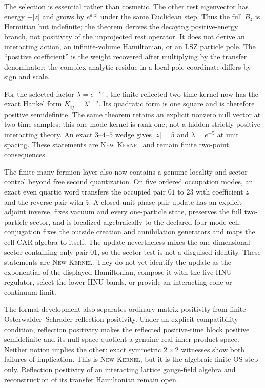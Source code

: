 \documentclass[11pt]{article}
\newcommand{\Kernel}{\textcolor{kernelcolor}{\textsc{Kernel}}}
\newcommand{\NewResult}{\textsc{New}}
\begin{document}
The selection is essential rather than cosmetic.  The other rest eigenvector
has energy $-|z|$ and grows by $e^{a|z|}$ under the same Euclidean step.  Thus
the full $B_z$ is Hermitian but indefinite; the theorem derives the decaying
positive-energy branch, not positivity of the unprojected rest operator.  It
does not derive an interacting action, an infinite-volume Hamiltonian, or an
LSZ particle pole.  The ``positive coefficient'' is the weight recovered after
multiplying by the transfer denominator; the complex-analytic residue in a
local pole coordinate differs by sign and scale.

For the selected factor $\lambda=e^{-a|z|}$, the finite reflected two-time
kernel now has the exact Hankel form $K_{ij}=\lambda^{i+j}$.  Its quadratic
form is one square and is therefore positive semidefinite.  The same theorem
retains an explicit nonzero null vector at two time samples: this one-mode
kernel is rank one, not a hidden strictly positive interacting theory.  An
exact $3$--$4$--$5$ wedge gives $|z|=5$ and $\lambda=e^{-5}$ at unit spacing.
These statements are \NewResult{} \Kernel{} and remain finite two-point
consequences.

The finite many-fermion layer also now contains a genuine locality-and-sector
control beyond free second quantization. On five ordered occupation modes, an
exact even quartic word transfers the occupied pair $01$ to $23$ with coefficient
$z$ and the reverse pair with $\bar z$. A closed unit-phase pair update has an
explicit adjoint inverse, fixes vacuum and every one-particle state, preserves
the full two-particle sector, and is localized algebraically to the declared
four-mode cell: conjugation fixes the outside creation and annihilation
generators and maps the cell CAR algebra to itself. The update nevertheless
mixes the one-dimensional sector containing only pair $01$, so the sector test
is not a disguised identity. These statements are \NewResult{} \Kernel{}.
They do not yet identify the update as the exponential of the displayed
Hamiltonian, compose it with the live HNU regulator, select the lower HNU bands,
or provide an interacting cone or continuum limit.

The formal development also separates ordinary matrix positivity from finite
Osterwalder--Schrader reflection positivity.  Under an explicit compatibility
condition, reflection positivity makes the reflected positive-time block
positive semidefinite and its null-space quotient a genuine real inner-product
space.  Neither notion implies the other: exact symmetric $2\times2$ witnesses
show both failures of implication.  This is \NewResult{} \Kernel{}, but it is
the algebraic finite OS step only.  Reflection positivity of an interacting
lattice gauge-field algebra and reconstruction of its transfer Hamiltonian
remain open.
\end{document}
